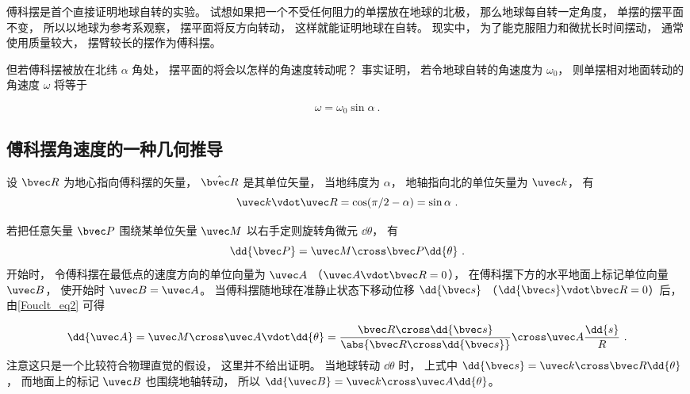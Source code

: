 

傅科摆是首个直接证明地球自转的实验。 试想如果把一个不受任何阻力的单摆放在地球的北极， 那么地球每自转一定角度， 单摆的摆平面不变， 所以以地球为参考系观察， 摆平面将反方向转动， 这样就能证明地球在自转。 现实中， 为了能克服阻力和微扰长时间摆动， 通常使用质量较大， 摆臂较长的摆作为傅科摆。

但若傅科摆被放在北纬 $\alpha$ 角处， 摆平面的将会以怎样的角速度转动呢？ 事实证明， 若令地球自转的角速度为 $\omega_0$， 则单摆相对地面转动的角速度 $\omega$ 将等于

\begin{equation}
\omega = \omega_0 \sin\alpha~.
\end{equation}

\subsection{傅科摆角速度的一种几何推导}
设 $\bvec R$ 为地心指向傅科摆的矢量， $\hat {\bvec R}$ 是其单位矢量， 当地纬度为 $\alpha$， 地轴指向北的单位矢量为 $\uvec k$， 有
\begin{equation}
\uvec k\vdot \uvec R = \cos(\pi/2 - \alpha) = \sin\alpha~.
\end{equation}

若把任意矢量 $\bvec P$ 围绕某单位矢量 $\uvec M$ 以右手定则旋转角微元 $\dd{\theta}$， 有
\begin{equation}\label{Fouclt_eq2}
\dd{\bvec P} = \uvec M \cross \bvec P \dd{\theta}~.
\end{equation}
开始时， 令傅科摆在最低点的速度方向的单位向量为 $\uvec A$ （$\uvec A\vdot \bvec R = 0$）， 在傅科摆下方的水平地面上标记单位向量 $\uvec B$， 使开始时 $\uvec B = \uvec A$。 当傅科摆随地球在准静止状态下移动位移 $\dd{\bvec s}$ （$\dd{\bvec s} \vdot\bvec R = 0$）后， 由\autoref{Fouclt_eq2} 可得

\begin{equation}
\dd{\uvec A} = \uvec M\cross \uvec A\vdot \dd{\theta} = 
\frac{\bvec R\cross \dd{\bvec s}}{\abs{\bvec R\cross \dd{\bvec s}}} \cross \uvec A \frac{\dd{s}}{R}~.
\end{equation}
注意这只是一个比较符合物理直觉的假设， 这里并不给出证明。 当地球转动 $\dd{\theta}$ 时， 上式中 $\dd{\bvec s} = \uvec k \cross \bvec R \dd{\theta}$， 而地面上的标记 $\uvec B$ 也围绕地轴转动， 所以 $\dd{\uvec B} = \uvec k \cross \uvec A \dd{\theta}$。

